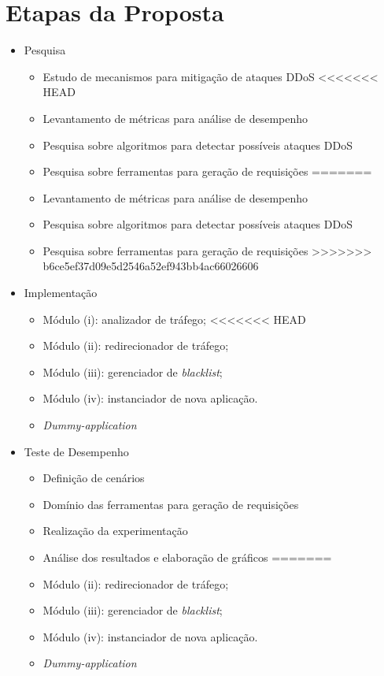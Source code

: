 \documentclass[a4paper, 11pt]{article}
\begin{document}
\section{Etapas da Proposta}
\begin{itemize}
 \item Pesquisa
  \begin{itemize}
    \item Estudo de mecanismos para mitiga\c{c}\~{a}o de ataques DDoS
<<<<<<< HEAD
\item Levantamento de métricas para análise de desempenho
\item Pesquisa sobre algoritmos para detectar possíveis ataques DDoS
\item Pesquisa sobre ferramentas para geração de requisições
=======
	\item Levantamento de métricas para análise de desempenho
	\item Pesquisa sobre algoritmos para detectar possíveis ataques DDoS
	\item Pesquisa sobre ferramentas para geração de requisições
>>>>>>> b6ce5ef37d09e5d2546a52ef943bb4ac66026606
  \end{itemize}

 \item Implementa\c{c}\~{a}o
  \begin{itemize}
      \item Módulo (i): analizador de tráfego;
<<<<<<< HEAD
\item Módulo (ii): redirecionador de tráfego;
\item Módulo (iii): gerenciador de \emph{blacklist};
\item Módulo (iv): instanciador de nova aplica\c{c}\~{a}o.
\item \emph{Dummy-application}
  \end{itemize}

 \item Teste de Desempenho
  \begin{itemize}
    \item Definição de cenários
\item Domínio das ferramentas para geração de requisições
\item Realização da experimentação
\item Análise dos resultados e elaboração de gráficos
=======
	  \item Módulo (ii): redirecionador de tráfego;
	  \item Módulo (iii): gerenciador de \emph{blacklist};
	  \item Módulo (iv): instanciador de nova aplica\c{c}\~{a}o.
	  \item \emph{Dummy-application}
  \end{itemize}


\end{itemize}
\end{document}
